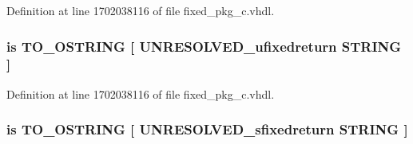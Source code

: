 Definition at line 1702038116 of file fixed\+\_\+pkg\+\_\+c.\+vhdl.

\hypertarget{classfixed__pkg_a12ff3b142afffe809b1746be35f356d0}{}
\subsubsection[{T\+O\+\_\+\+O\+C\+T\+A\+L\+\_\+\+S\+T\+R\+I\+N\+G}]{ {\bfseries \textcolor{keywordflow}{is}\textcolor{vhdlchar}{ }\textcolor{vhdlchar}{T\+O\+\_\+\+O\+S\+T\+R\+I\+N\+G}\textcolor{vhdlchar}{ }\textcolor{vhdlchar}{\mbox{[}}\textcolor{vhdlchar}{ }\textcolor{vhdlchar}{U\+N\+R\+E\+S\+O\+L\+V\+E\+D\+\_\+ufixedreturn}\textcolor{vhdlchar}{ }\textcolor{comment}{S\+T\+R\+I\+N\+G}\textcolor{vhdlchar}{ }\textcolor{vhdlchar}{\mbox{]}}\textcolor{vhdlchar}{ }} \hspace{0.3cm}{\ttfamily [Alias]}}\label{classfixed__pkg_a12ff3b142afffe809b1746be35f356d0}


Definition at line 1702038116 of file fixed\+\_\+pkg\+\_\+c.\+vhdl.

\hypertarget{classfixed__pkg_aa56ca82d6a449c1ff4961a4ac182c355}{}
\subsubsection[{T\+O\+\_\+\+O\+C\+T\+A\+L\+\_\+\+S\+T\+R\+I\+N\+G}]{ {\bfseries \textcolor{keywordflow}{is}\textcolor{vhdlchar}{ }\textcolor{vhdlchar}{T\+O\+\_\+\+O\+S\+T\+R\+I\+N\+G}\textcolor{vhdlchar}{ }\textcolor{vhdlchar}{\mbox{[}}\textcolor{vhdlchar}{ }\textcolor{vhdlchar}{U\+N\+R\+E\+S\+O\+L\+V\+E\+D\+\_\+sfixedreturn}\textcolor{vhdlchar}{ }\textcolor{comment}{S\+T\+R\+I\+N\+G}\textcolor{vhdlchar}{ }\textcolor{vhdlchar}{\mbox{]}}\textcolor{vhdlchar}{ }} \hspace{0.3cm}{\ttfamily [Alias]}}\label{classfixed__pkg_aa56ca82d6a449c1ff4961a4ac182c355}


